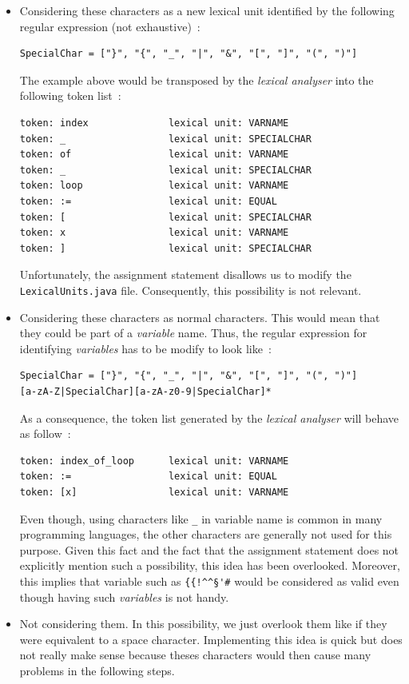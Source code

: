 \documentclass[a4paper,11pt]{article}
\begin{document}
    \begin{itemize}
      \item Considering these characters as a new lexical unit identified by the following regular expression (not exhaustive)~:
        \begin{verbatim}
SpecialChar = ["}", "{", "_", "|", "&", "[", "]", "(", ")"]
        \end{verbatim}
        The example above would be transposed by the \textit{lexical analyser} into the following token list~:
        \begin{verbatim}
token: index              lexical unit: VARNAME
token: _                  lexical unit: SPECIALCHAR
token: of                 lexical unit: VARNAME
token: _                  lexical unit: SPECIALCHAR
token: loop               lexical unit: VARNAME
token: :=                 lexical unit: EQUAL
token: [                  lexical unit: SPECIALCHAR
token: x                  lexical unit: VARNAME
token: ]                  lexical unit: SPECIALCHAR
        \end{verbatim}
        Unfortunately, the assignment statement disallows us to modify the \verb|LexicalUnits.java| file. Consequently, this possibility is not relevant.
      \item Considering these characters as normal characters. This would mean that they could be part of a \textit{variable} name. Thus, the regular expression for identifying \textit{variables} has to be modify to look like~:
        \begin{verbatim}
SpecialChar = ["}", "{", "_", "|", "&", "[", "]", "(", ")"]
[a-zA-Z|SpecialChar][a-zA-z0-9|SpecialChar]*
        \end{verbatim}
        As a consequence, the token list generated by the \textit{lexical analyser} will behave as follow~:
        \begin{verbatim}
token: index_of_loop      lexical unit: VARNAME
token: :=                 lexical unit: EQUAL
token: [x]                lexical unit: VARNAME
        \end{verbatim}
        Even though, using characters like \verb|_| in variable name is common in many programming languages, the other characters are generally not used for this purpose. Given this fact and the fact that the assignment statement does not explicitly mention such a possibility, this idea has been overlooked. Moreover, this implies that variable such as \verb|{{!^^§'#| would be considered as valid even though having such \textit{variables} is not handy.
      \item Not considering them. In this possibility, we just overlook them like if they were equivalent to a space character. Implementing this idea is quick but does not really make sense because theses characters would then cause many problems in the following steps.

\end{itemize}
\end{document}

